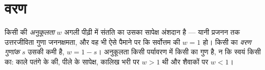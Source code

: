 \section{वरण}

\begin{definition}[अनुकूलता]\label{def:b2:population-genetics:fitness}
किसी  की \emph{अनुकूलता} $w$ अगली पीढ़ी में संतति का उसका
सापेक्ष अंशदान है --- यानी प्रजनन तक उत्तरजीविता
गुणा जननक्षमता, और वह भी ऐसे पैमाने पर कि सर्वोत्तम  की $w = 1$ हो।
किसी  का \emph{वरण गुणांक} $s$ उसकी कमी है,
$w = 1 - s$। अनुकूलता किसी पर्यावरण में किसी  का गुण है,
न कि स्वयं किसी  का: काले पतंगे के  की, पीले के सापेक्ष,
कालिख भरी  पर $w > 1$ थी और शैवाकों पर $w < 1$।
\end{definition}

